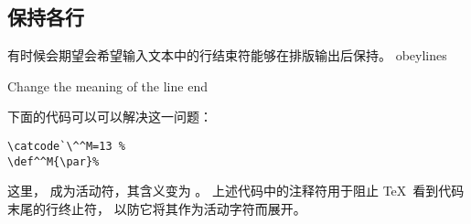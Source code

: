 \documentclass{book}
\begin{document}
\subsection{保持各行}

有时候会期望会希望输入文本中的行结束符能够在排版输出后保持。
%
\cstoidx obeylines\par\howto Change the meaning of the line end\par
下面的代码可以可以解决这一问题：
\begin{verbatim}
\catcode`\^^M=13 %
\def^^M{\par}%
\end{verbatim}
这里， 成为活动符，其含义变为 。
上述代码中的注释符用于阻止 \TeX\ 看到代码末尾的行终止符，
以防它将其作为活动字符而展开。
\end{document}
